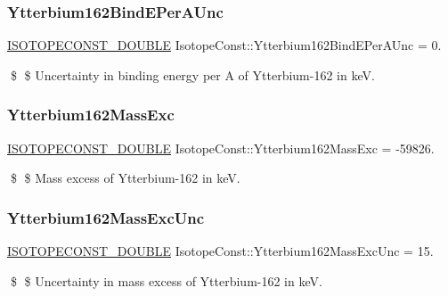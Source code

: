 \subsubsection{\texorpdfstring{Ytterbium162\+Bind\+E\+Per\+A\+Unc}{Ytterbium162BindEPerAUnc}}
{\footnotesize\ttfamily \mbox{\hyperlink{group___isotope_const-_macros_ga8f45a7272ce02c0b4c65c44636ed719a}{I\+S\+O\+T\+O\+P\+E\+C\+O\+N\+S\+T\+\_\+\+D\+O\+U\+B\+LE}} Isotope\+Const\+::\+Ytterbium162\+Bind\+E\+Per\+A\+Unc = 0.}

\$ \$ Uncertainty in binding energy per A of Ytterbium-\/162 in keV. \mbox{\label{group___isotope_const-_ytterbium-_yb162_ga02143766b30b335754537d8f33257d70}} 
\subsubsection{\texorpdfstring{Ytterbium162\+Mass\+Exc}{Ytterbium162MassExc}}
{\footnotesize\ttfamily \mbox{\hyperlink{group___isotope_const-_macros_ga8f45a7272ce02c0b4c65c44636ed719a}{I\+S\+O\+T\+O\+P\+E\+C\+O\+N\+S\+T\+\_\+\+D\+O\+U\+B\+LE}} Isotope\+Const\+::\+Ytterbium162\+Mass\+Exc = -\/59826.}

\$ \$ Mass excess of Ytterbium-\/162 in keV. \mbox{\label{group___isotope_const-_ytterbium-_yb162_gae66bb50e49e826427515769223197fb8}} 
\subsubsection{\texorpdfstring{Ytterbium162\+Mass\+Exc\+Unc}{Ytterbium162MassExcUnc}}
{\footnotesize\ttfamily \mbox{\hyperlink{group___isotope_const-_macros_ga8f45a7272ce02c0b4c65c44636ed719a}{I\+S\+O\+T\+O\+P\+E\+C\+O\+N\+S\+T\+\_\+\+D\+O\+U\+B\+LE}} Isotope\+Const\+::\+Ytterbium162\+Mass\+Exc\+Unc = 15.}

\$ \$ Uncertainty in mass excess of Ytterbium-\/162 in keV. \mbox{\label{group___isotope_const-_ytterbium-_yb162_gab12945a82c7b4e757920c99345fc5f38}} 
